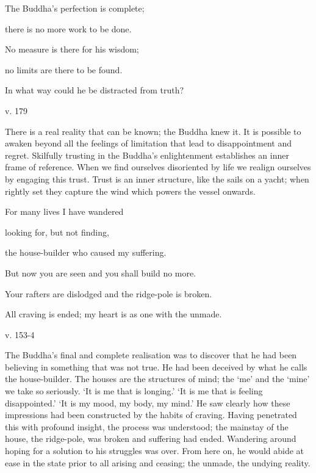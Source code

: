\documentclass[a4paper,portrait,12pt]{article}
\begin{document}
The Buddha's perfection is complete;


there is no more work to be done.


No measure is there for his wisdom;


no limits are there to be found.


In what way could he be distracted from truth?





v. 179





There is a real reality that can be known; the Buddha knew it. It is possible to awaken beyond all the feelings of limitation that lead to disappointment and regret. Skilfully trusting in the Buddha's enlightenment establishes an inner frame of reference. When we find ourselves disoriented by life we realign ourselves by engaging this trust. Trust is an inner structure, like the sails on a yacht; when rightly set they capture the wind which powers the vessel onwards.














For many lives I have wandered


looking for, but not finding,


the house-builder who caused my suffering.


But now you are seen and you shall build no more.


Your rafters are dislodged and the ridge-pole is broken.


All craving is ended; my heart is as one with the unmade.





v. 153-4





The Buddha's final and complete realisation was to discover that he had been believing in something that was not true. He had been deceived by what he calls the house-builder. The houses are the structures of mind; the `me' and the `mine' we take so seriously. `It is me that is longing.' `It is me that is feeling disappointed.'  `It is my mood, my body, my mind.'  He saw clearly how these impressions had been constructed by the habits of craving. Having penetrated this with profound insight, the process was understood; the mainstay of the house, the ridge-pole, was broken and suffering had ended. Wandering around hoping for a solution to his struggles was over. From here on, he would abide at ease in the state prior to all arising and ceasing; the unmade, the undying reality.
\end{document}
